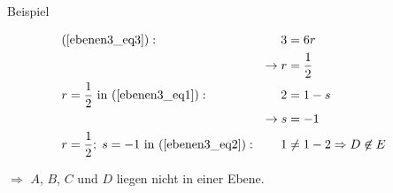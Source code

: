 \documentclass{article}
\begin{document}
\begin{boxx}[DarkBlue]{Beispiel}
\begin{align}
    \end{align}
    \begin{align*}
        &&&&&&&\text{(\ref{ebenen3_eq3})}:& 3 &= 6r &&&&&&&&\\
        &&&&&&&& \rightarrow r &= \frac{1}{2} \\
        &&&&&&& r = \frac{1}{2} \text{ in (\ref{ebenen3_eq1})}:& 2 &= 1 - s \\
        &&&&&&&& \rightarrow s &= -1 \\
        &&&&&&& r = \frac{1}{2};\; s = -1\text{ in (\ref{ebenen3_eq2})}:& 1 &\not= 1 - 2 \Rightarrow D\not\in E
    \end{align*}
    \begin{center}
        $\Rightarrow$ $A$, $B$, $C$ und $D$ liegen nicht in einer Ebene.
    \end{center}
\end{boxx}
\end{document}
